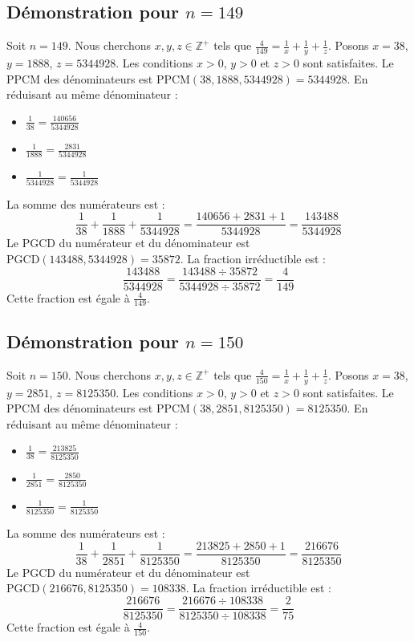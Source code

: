 \documentclass[11pt,a4paper]{article}
\begin{document}
\subsection{Démonstration pour $n = 149$}
Soit $n = 149$. Nous cherchons $x, y, z \in \mathbb{Z}^{+}$ tels que $\frac{4}{149} = \frac{1}{x} + \frac{1}{y} + \frac{1}{z}$.
Posons $x = 38$, $y = 1888$, $z = 5344928$.
Les conditions $x > 0$, $y > 0$ et $z > 0$ sont satisfaites.
Le PPCM des dénominateurs est $\text{PPCM}(38, 1888, 5344928) = 5344928$.
En réduisant au même dénominateur :
\begin{itemize}
    \item $\frac{1}{38} = \frac{140656}{5344928}$
    \item $\frac{1}{1888} = \frac{2831}{5344928}$
    \item $\frac{1}{5344928} = \frac{1}{5344928}$
\end{itemize}
La somme des numérateurs est :
$$ \frac{1}{38} + \frac{1}{1888} + \frac{1}{5344928} = \frac{140656 + 2831 + 1}{5344928} = \frac{143488}{5344928} $$
Le PGCD du numérateur et du dénominateur est $\text{PGCD}(143488, 5344928) = 35872$.
La fraction irréductible est :
$$ \frac{143488}{5344928} = \frac{143488 \div 35872}{5344928 \div 35872} = \frac{4}{149} $$
Cette fraction est égale à $\frac{4}{149}$.

\subsection{Démonstration pour $n = 150$}
Soit $n = 150$. Nous cherchons $x, y, z \in \mathbb{Z}^{+}$ tels que $\frac{4}{150} = \frac{1}{x} + \frac{1}{y} + \frac{1}{z}$.
Posons $x = 38$, $y = 2851$, $z = 8125350$.
Les conditions $x > 0$, $y > 0$ et $z > 0$ sont satisfaites.
Le PPCM des dénominateurs est $\text{PPCM}(38, 2851, 8125350) = 8125350$.
En réduisant au même dénominateur :
\begin{itemize}
    \item $\frac{1}{38} = \frac{213825}{8125350}$
    \item $\frac{1}{2851} = \frac{2850}{8125350}$
    \item $\frac{1}{8125350} = \frac{1}{8125350}$
\end{itemize}
La somme des numérateurs est :
$$ \frac{1}{38} + \frac{1}{2851} + \frac{1}{8125350} = \frac{213825 + 2850 + 1}{8125350} = \frac{216676}{8125350} $$
Le PGCD du numérateur et du dénominateur est $\text{PGCD}(216676, 8125350) = 108338$.
La fraction irréductible est :
$$ \frac{216676}{8125350} = \frac{216676 \div 108338}{8125350 \div 108338} = \frac{2}{75} $$
Cette fraction est égale à $\frac{4}{150}$.
\end{document}
